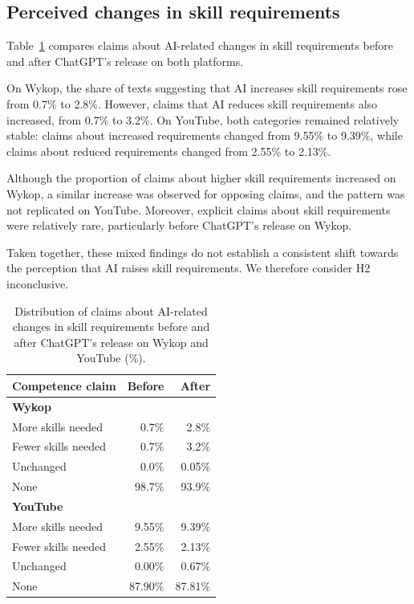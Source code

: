 \documentclass[11pt]{article}
\begin{document}
\subsection{Perceived changes in skill requirements}

Table~\ref{tab:competence-compare} compares claims about
AI-related changes in skill requirements before and after
ChatGPT's release on both platforms.

On Wykop, the share of texts suggesting that AI increases
skill requirements rose from 0.7\% to 2.8\%. However,
claims that AI reduces skill requirements also increased,
from 0.7\% to 3.2\%. On YouTube, both categories remained
relatively stable: claims about increased requirements
changed from 9.55\% to 9.39\%, while claims about reduced
requirements changed from 2.55\% to 2.13\%.

Although the proportion of claims about higher skill
requirements increased on Wykop, a similar increase was
observed for opposing claims, and the pattern was not
replicated on YouTube. Moreover, explicit claims about
skill requirements were relatively rare, particularly
before ChatGPT's release on Wykop.

Taken together, these mixed findings do not establish
a consistent shift towards the perception that AI raises
skill requirements. We therefore consider H2 inconclusive.

\begin{table}[t]
\centering
\small
\begin{tabular}{lrr}
\toprule
Competence claim & Before & After \\
\midrule
\multicolumn{3}{l}{\textbf{Wykop}} \\
\midrule
More skills needed  & 0.7\% & 2.8\% \\
Fewer skills needed & 0.7\% & 3.2\% \\
Unchanged           & 0.0\% & 0.05\% \\
None                & 98.7\% & 93.9\% \\
\midrule
\multicolumn{3}{l}{\textbf{YouTube}} \\
\midrule
More skills needed  & 9.55\% & 9.39\% \\
Fewer skills needed & 2.55\% & 2.13\% \\
Unchanged           & 0.00\% & 0.67\% \\
None                & 87.90\% & 87.81\% \\
\bottomrule
\end{tabular}
\caption{Distribution of claims about AI-related changes
in skill requirements before and after ChatGPT's release
on Wykop and YouTube (\%).}
\label{tab:competence-compare}
\end{table}
\end{document}
